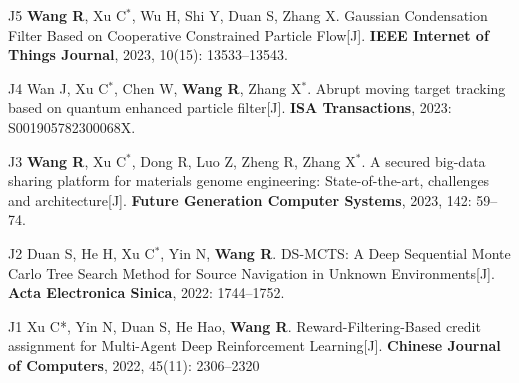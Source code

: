         
        \pub
        {J5}
        {\textbf{Wang R}, Xu C$^*$, Wu H, Shi Y, Duan S, Zhang X. Gaussian Condensation Filter Based on Cooperative Constrained Particle Flow[J]. \textbf{IEEE Internet of Things Journal}, 2023, 10(15): 13533–13543.}
               
        \pub
        {J4}
        {Wan J, Xu C$^*$, Chen W, \textbf{Wang R}, Zhang X$^*$. Abrupt moving target tracking based on quantum enhanced particle filter[J]. \textbf{ISA Transactions}, 2023: S001905782300068X.}
        
        \pub
        {J3}
        {\textbf{Wang R}, Xu C$^*$, Dong R, Luo Z, Zheng R, Zhang X$^*$. A secured big-data sharing platform for materials genome engineering: State-of-the-art, challenges and architecture[J]. \textbf{Future Generation Computer Systems}, 2023, 142: 59–74.}
        
        
        \pub
        {J2}
        {Duan S, He H, Xu C$^*$, Yin N, \textbf{Wang R}. DS-MCTS: A Deep Sequential Monte Carlo Tree Search Method for Source Navigation in Unknown Environments[J]. \textbf{Acta Electronica Sinica}, 2022: 1744–1752.}
        
         \pub
        {J1}
        {Xu C*, Yin N, Duan S, He Hao, \textbf{Wang R}. Reward-Filtering-Based credit assignment for Multi-Agent Deep Reinforcement Learning[J]. \textbf{Chinese Journal of Computers}, 2022, 45(11): 2306–2320}
   
